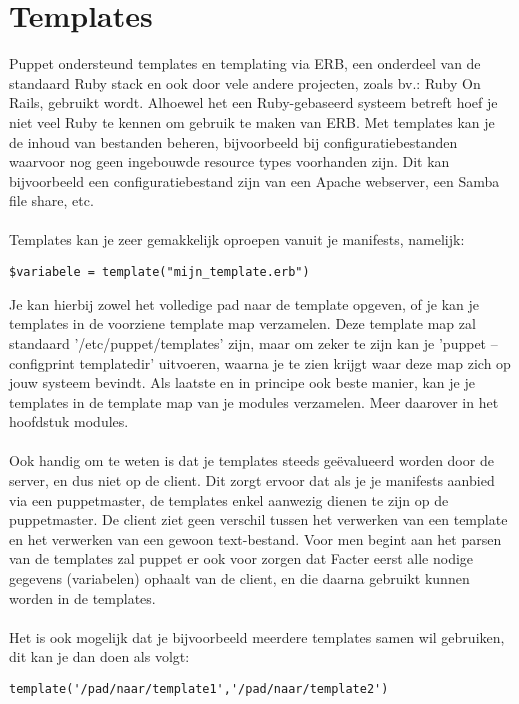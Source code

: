 \chapter{Templates}

Puppet ondersteund templates en templating via ERB, een onderdeel van de standaard Ruby stack en ook door vele andere projecten, zoals bv.: Ruby On Rails, gebruikt wordt. Alhoewel het een Ruby-gebaseerd systeem betreft hoef je niet veel Ruby te kennen om gebruik te maken van ERB. Met templates kan je de inhoud van bestanden beheren, bijvoorbeeld bij configuratiebestanden waarvoor nog geen ingebouwde resource types voorhanden zijn. Dit kan bijvoorbeeld een configuratiebestand zijn van een Apache webserver, een Samba file share, etc.\\\\
Templates kan je zeer gemakkelijk oproepen vanuit je manifests, namelijk:
%
\begin{code}
\begin{lstlisting}
$variabele = template("mijn_template.erb")
\end{lstlisting}
\end{code}
%
Je kan hierbij zowel het volledige pad naar de template opgeven, of je kan je templates in de voorziene template map verzamelen. Deze template map zal standaard '/etc/puppet/templates' zijn, maar om zeker te zijn kan je 'puppet --configprint templatedir' uitvoeren, waarna je te zien krijgt waar deze map zich op jouw systeem bevindt. Als laatste en in principe ook beste manier, kan je je templates in de template map van je modules verzamelen. Meer daarover in het hoofdstuk modules.\\\\
Ook handig om te weten is dat je templates steeds ge\"{e}valueerd worden door de server, en dus niet op de client. Dit zorgt ervoor dat als je je manifests aanbied via een puppetmaster, de templates enkel aanwezig dienen te zijn op de puppetmaster. De client ziet geen verschil tussen het verwerken van een template en het verwerken van een gewoon text-bestand. Voor men begint aan het parsen van de templates zal puppet er ook voor zorgen dat Facter eerst alle nodige gegevens (variabelen) ophaalt van de client, en die daarna gebruikt kunnen worden in de templates.\\\\
Het is ook mogelijk dat je bijvoorbeeld meerdere templates samen wil gebruiken, dit kan je dan doen als volgt:
%
\begin{code}
\begin{lstlisting}
template('/pad/naar/template1','/pad/naar/template2')
\end{lstlisting}
\end{code}
%
